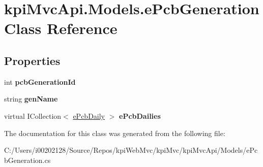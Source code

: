 \hypertarget{classkpi_mvc_api_1_1_models_1_1e_pcb_generation}{}\section{kpi\+Mvc\+Api.\+Models.\+e\+Pcb\+Generation Class Reference}
\label{classkpi_mvc_api_1_1_models_1_1e_pcb_generation}
\subsection*{Properties}
\begin{DoxyCompactItemize}
\item 
\mbox{\label{classkpi_mvc_api_1_1_models_1_1e_pcb_generation_a957db55e8af873bf6c3cdc377ca6ed42}} 
int {\bfseries pcb\+Generation\+Id}
\item 
\mbox{\label{classkpi_mvc_api_1_1_models_1_1e_pcb_generation_a8170070803e54c8b687d920eca03eec4}} 
string {\bfseries gen\+Name}
\item 
\mbox{\label{classkpi_mvc_api_1_1_models_1_1e_pcb_generation_a3e342aa4a757fbf044b5a36a3b9cd36a}} 
virtual I\+Collection$<$ \hyperlink{classkpi_mvc_api_1_1_models_1_1e_pcb_daily}{e\+Pcb\+Daily} $>$ {\bfseries e\+Pcb\+Dailies}
\end{DoxyCompactItemize}


The documentation for this class was generated from the following file\+:\begin{DoxyCompactItemize}
\item 
C\+:/\+Users/i00202128/\+Source/\+Repos/kpi\+Web\+Mvc/kpi\+Mvc/kpi\+Mvc\+Api/\+Models/e\+Pcb\+Generation.\+cs\end{DoxyCompactItemize}
